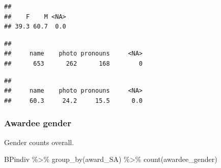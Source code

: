 \documentclass[
]{article}
\newenvironment{Shaded}{\begin{snugshade}}{\end{snugshade}}
\newcommand{\AttributeTok}[1]{\textcolor[rgb]{0.77,0.63,0.00}{#1}}
\newcommand{\CommentTok}[1]{\textcolor[rgb]{0.56,0.35,0.01}{\textit{#1}}}
\newcommand{\DecValTok}[1]{\textcolor[rgb]{0.00,0.00,0.81}{#1}}
\newcommand{\FunctionTok}[1]{\textcolor[rgb]{0.00,0.00,0.00}{#1}}
\newcommand{\NormalTok}[1]{#1}
\newcommand{\SpecialCharTok}[1]{\textcolor[rgb]{0.00,0.00,0.00}{#1}}
\newcommand{\StringTok}[1]{\textcolor[rgb]{0.31,0.60,0.02}{#1}}
\begin{document}
\begin{verbatim}
## 
##    F    M <NA> 
## 39.3 60.7  0.0
\end{verbatim}

\begin{Shaded}
\end{Shaded}

\begin{verbatim}
## 
##     name    photo pronouns     <NA> 
##      653      262      168        0
\end{verbatim}

\begin{Shaded}
\end{Shaded}

\begin{verbatim}
## 
##     name    photo pronouns     <NA> 
##     60.3     24.2     15.5      0.0
\end{verbatim}

\hypertarget{awardee-gender}{%
\subsubsection{Awardee gender}\label{awardee-gender}}

Gender counts overall.

\begin{Shaded}
\begin{Highlighting}[]
\NormalTok{BPindiv }\SpecialCharTok{\%\textgreater{}\%}  
   \FunctionTok{group\_by}\NormalTok{(award\_SA) }\SpecialCharTok{\%\textgreater{}\%}
   \FunctionTok{count}\NormalTok{(awardee\_gender)}
\end{Highlighting}
\end{Shaded}
\end{document}
